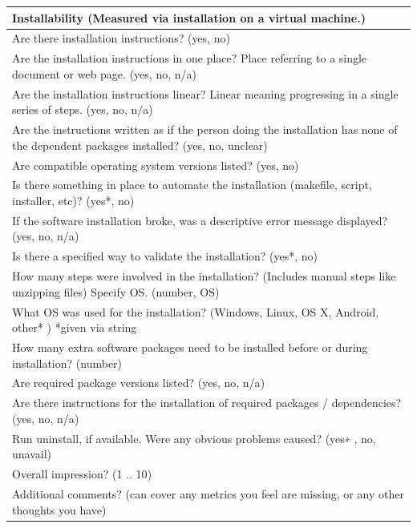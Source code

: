 \documentclass[12pt, notitlepage]{article}
\begin{document}
\begin{singlespace}
\def\arraystretch{1.5}
\begin{tabular}{p{16cm}}
		\hline		
		\textbf{Installability  (Measured via installation on a virtual machine.) }\\
		\hline
		Are there installation instructions? ({yes, no})\\
		Are the installation instructions in one place? Place referring to a single document or web page. ({yes, no, n/a})\\
		Are the installation instructions linear? Linear meaning progressing  in a single series of steps. ({yes, no, n/a})\\
		Are the instructions written as if the person doing the installation has none of the dependent packages installed? ({yes, no, unclear})\\
		Are compatible operating system versions listed? ({yes, no})\\
		Is there something in place to automate the installation (makefile, script, installer, etc)? ({yes*, no})\\
		If the software installation broke, was a descriptive error message displayed? ({yes, no, n/a})\\
		Is there a specified way to validate the installation? ({yes*, no})\\
		How many steps were involved in the installation? (Includes manual steps like unzipping files) Specify OS. (number, OS)\\
		What OS was used for the installation? ({Windows, Linux, OS X, Android, other* }) *given via string\\
		How many extra software packages need to be installed before or during installation? (number)\\
		Are required package versions listed? ({yes, no, n/a})\\
		Are there instructions for the installation of required packages / dependencies? ({yes, no, n/a})\\
		Run uninstall, if available. Were any obvious problems caused? ({yes∗ , no, unavail})\\
		Overall impression? ({1 .. 10})\\
		Additional comments? (can cover any metrics you feel are missing, or any other thoughts you have)\\
		\hline
\end{tabular}


\end{singlespace}
\end{document}
